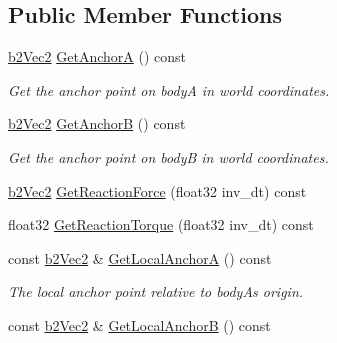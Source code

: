 \subsection*{Public Member Functions}
\begin{DoxyCompactItemize}
\item 
\hyperlink{structb2_vec2}{b2\+Vec2} \hyperlink{classb2_distance_joint_a66c1cb4deff1166c1dab67df6047a89c}{Get\+AnchorA} () const \hypertarget{classb2_distance_joint_a66c1cb4deff1166c1dab67df6047a89c}{}\label{classb2_distance_joint_a66c1cb4deff1166c1dab67df6047a89c}

\begin{DoxyCompactList}\small\item\em Get the anchor point on bodyA in world coordinates. \end{DoxyCompactList}\item 
\hyperlink{structb2_vec2}{b2\+Vec2} \hyperlink{classb2_distance_joint_afc58d85cf7cc5e23082cf469e1a1a067}{Get\+AnchorB} () const \hypertarget{classb2_distance_joint_afc58d85cf7cc5e23082cf469e1a1a067}{}\label{classb2_distance_joint_afc58d85cf7cc5e23082cf469e1a1a067}

\begin{DoxyCompactList}\small\item\em Get the anchor point on bodyB in world coordinates. \end{DoxyCompactList}\item 
\hyperlink{structb2_vec2}{b2\+Vec2} \hyperlink{classb2_distance_joint_a99413cc114b2f4dc4ce7693c062ce226}{Get\+Reaction\+Force} (float32 inv\+\_\+dt) const 
\item 
float32 \hyperlink{classb2_distance_joint_a8d65840abe0b398399020524852788fd}{Get\+Reaction\+Torque} (float32 inv\+\_\+dt) const 
\item 
const \hyperlink{structb2_vec2}{b2\+Vec2} \& \hyperlink{classb2_distance_joint_a75a41c40f21e48a6f9e947dd1dc46db4}{Get\+Local\+AnchorA} () const \hypertarget{classb2_distance_joint_a75a41c40f21e48a6f9e947dd1dc46db4}{}\label{classb2_distance_joint_a75a41c40f21e48a6f9e947dd1dc46db4}

\begin{DoxyCompactList}\small\item\em The local anchor point relative to bodyA\textquotesingle{}s origin. \end{DoxyCompactList}\item 
const \hyperlink{structb2_vec2}{b2\+Vec2} \& \hyperlink{classb2_distance_joint_a22e9572c8b3d1f0619b340738811c082}{Get\+Local\+AnchorB} () const \hypertarget{classb2_distance_joint_a22e9572c8b3d1f0619b340738811c082}{}\label{classb2_distance_joint_a22e9572c8b3d1f0619b340738811c082}


\end{DoxyCompactItemize}
